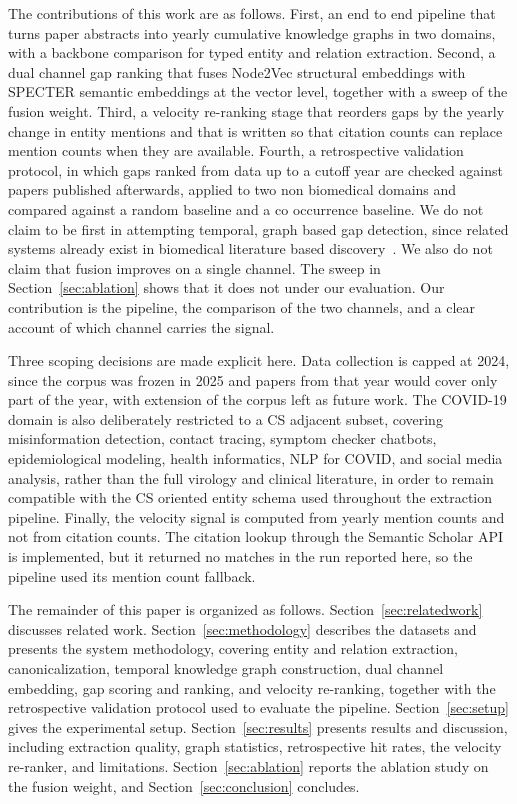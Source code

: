 \documentclass{ieeeaccess}
\begin{document}
The contributions of this work are as follows. First, an end to end pipeline that turns paper abstracts into yearly cumulative knowledge graphs in two domains, with a backbone comparison for typed entity and relation extraction. Second, a dual channel gap ranking that fuses Node2Vec structural embeddings with SPECTER semantic embeddings at the vector level, together with a sweep of the fusion weight. Third, a velocity re-ranking stage that reorders gaps by the yearly change in entity mentions and that is written so that citation counts can replace mention counts when they are available. Fourth, a retrospective validation protocol, in which gaps ranked from data up to a cutoff year are checked against papers published afterwards, applied to two non biomedical domains and compared against a random baseline and a co occurrence baseline. We do not claim to be first in attempting temporal, graph based gap detection, since related systems already exist in biomedical literature based discovery~\cite{sybrandt2020agatha}. We also do not claim that fusion improves on a single channel. The sweep in Section~\ref{sec:ablation} shows that it does not under our evaluation. Our contribution is the pipeline, the comparison of the two channels, and a clear account of which channel carries the signal.

Three scoping decisions are made explicit here. Data collection is capped at 2024, since the corpus was frozen in 2025 and papers from that year would cover only part of the year, with extension of the corpus left as future work. The COVID-19 domain is also deliberately restricted to a CS adjacent subset, covering misinformation detection, contact tracing, symptom checker chatbots, epidemiological modeling, health informatics, NLP for COVID, and social media analysis, rather than the full virology and clinical literature, in order to remain compatible with the CS oriented entity schema used throughout the extraction pipeline. Finally, the velocity signal is computed from yearly mention counts and not from citation counts. The citation lookup through the Semantic Scholar API is implemented, but it returned no matches in the run reported here, so the pipeline used its mention count fallback.

The remainder of this paper is organized as follows. Section~\ref{sec:relatedwork} discusses related work. Section~\ref{sec:methodology} describes the datasets and presents the system methodology, covering entity and relation extraction, canonicalization, temporal knowledge graph construction, dual channel embedding, gap scoring and ranking, and velocity re-ranking, together with the retrospective validation protocol used to evaluate the pipeline. Section~\ref{sec:setup} gives the experimental setup. Section~\ref{sec:results} presents results and discussion, including extraction quality, graph statistics, retrospective hit rates, the velocity re-ranker, and limitations. Section~\ref{sec:ablation} reports the ablation study on the fusion weight, and Section~\ref{sec:conclusion} concludes.
\end{document}
